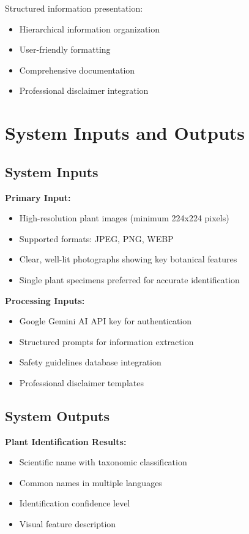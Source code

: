 \documentclass[conference]{IEEEtran}
\begin{document}
Structured information presentation:

\begin{itemize}
\item Hierarchical information organization
\item User-friendly formatting
\item Comprehensive documentation
\item Professional disclaimer integration
\end{itemize}

\section{System Inputs and Outputs}

\subsection{System Inputs}

\textbf{Primary Input:}
\begin{itemize}
\item High-resolution plant images (minimum 224x224 pixels)
\item Supported formats: JPEG, PNG, WEBP
\item Clear, well-lit photographs showing key botanical features
\item Single plant specimens preferred for accurate identification
\end{itemize}

\textbf{Processing Inputs:}
\begin{itemize}
\item Google Gemini AI API key for authentication
\item Structured prompts for information extraction
\item Safety guidelines database integration
\item Professional disclaimer templates
\end{itemize}

\subsection{System Outputs}

\textbf{Plant Identification Results:}
\begin{itemize}
\item Scientific name with taxonomic classification
\item Common names in multiple languages
\item Identification confidence level
\item Visual feature description
\end{itemize}
\end{document}
